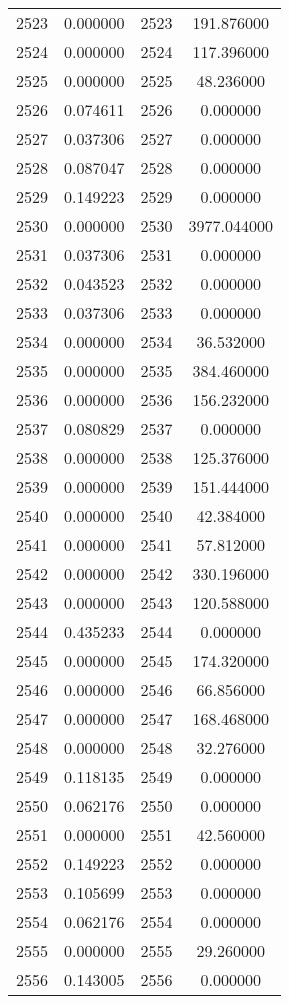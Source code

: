 \documentclass[12pt]{article}
\begin{document}
\begin{longtable}{@{}cccc@{}}
2523 & 0.000000 & 2523 & 191.876000 \\
2524 & 0.000000 & 2524 & 117.396000 \\
2525 & 0.000000 & 2525 & 48.236000 \\
2526 & 0.074611 & 2526 & 0.000000 \\
2527 & 0.037306 & 2527 & 0.000000 \\
2528 & 0.087047 & 2528 & 0.000000 \\
2529 & 0.149223 & 2529 & 0.000000 \\
2530 & 0.000000 & 2530 & 3977.044000 \\
2531 & 0.037306 & 2531 & 0.000000 \\
2532 & 0.043523 & 2532 & 0.000000 \\
2533 & 0.037306 & 2533 & 0.000000 \\
2534 & 0.000000 & 2534 & 36.532000 \\
2535 & 0.000000 & 2535 & 384.460000 \\
2536 & 0.000000 & 2536 & 156.232000 \\
2537 & 0.080829 & 2537 & 0.000000 \\
2538 & 0.000000 & 2538 & 125.376000 \\
2539 & 0.000000 & 2539 & 151.444000 \\
2540 & 0.000000 & 2540 & 42.384000 \\
2541 & 0.000000 & 2541 & 57.812000 \\
2542 & 0.000000 & 2542 & 330.196000 \\
2543 & 0.000000 & 2543 & 120.588000 \\
2544 & 0.435233 & 2544 & 0.000000 \\
2545 & 0.000000 & 2545 & 174.320000 \\
2546 & 0.000000 & 2546 & 66.856000 \\
2547 & 0.000000 & 2547 & 168.468000 \\
2548 & 0.000000 & 2548 & 32.276000 \\
2549 & 0.118135 & 2549 & 0.000000 \\
2550 & 0.062176 & 2550 & 0.000000 \\
2551 & 0.000000 & 2551 & 42.560000 \\
2552 & 0.149223 & 2552 & 0.000000 \\
2553 & 0.105699 & 2553 & 0.000000 \\
2554 & 0.062176 & 2554 & 0.000000 \\
2555 & 0.000000 & 2555 & 29.260000 \\
2556 & 0.143005 & 2556 & 0.000000 \\

\end{longtable}
\end{document}
